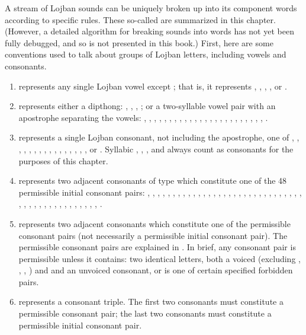 A stream of Lojban sounds can be uniquely broken up into its component words according to specific rules. These so-called  are summarized in this chapter. (However, a detailed algorithm for breaking sounds into words has not yet been fully debugged, and so is not presented in this book.) First, here are some conventions used to talk about groups of Lojban letters, including vowels and consonants.
\begin{enumerate}
\item {} represents any single Lojban vowel except ; that is, it represents , , , , or .
\item {} represents either a dipthong: , , , ; or a two-syllable vowel pair with an apostrophe separating the vowels: , , , , , , , , , , , , , , , , , , , , , , , , .
\item {} represents a single Lojban consonant, not including the apostrophe, one of , , , , , , , , , , , , , , , , or . Syllabic , , , and  always count as consonants for the purposes of this chapter.
\item {} represents two adjacent consonants of type  which constitute one of the 48 permissible initial consonant pairs: , , , , , , , , , , , , , , , , , , , , , , , , , , , , , , , , , , , , , , , , , , , , , , , .
\item {} represents two adjacent consonants which constitute one of the permissible consonant pairs (not necessarily a permissible initial consonant pair). The permissible consonant pairs are explained in . In brief, any consonant pair is permissible unless it contains: two identical letters, both a voiced (excluding , , , ) and and an unvoiced consonant, or is one of certain specified forbidden pairs.
\item {} represents a consonant triple. The first two consonants must constitute a permissible consonant pair; the last two consonants must constitute a permissible initial consonant pair.
\end{enumerate}

